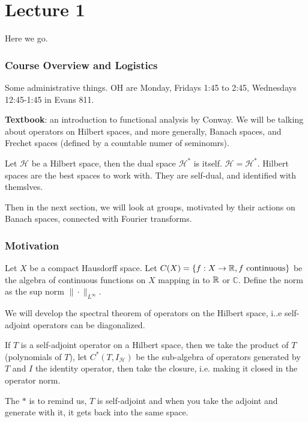 \chapter{Lecture 1}
Here we go.

\subsection{Course Overview and Logistics}
Some administrative things.
OH are Monday, Fridays 1:45 to 2:45, Wednesdays 12:45-1:45 in Evans 811.

\textbf{Textbook}: an introduction to functional analysis by Conway.
We will be talking about operators on Hilbert spaces, and more generally, Banach spaces, and Frechet spaces (defined by a countable numer of seminomrs).

\begin{remark}
    Let $\mathcal{H}$ be a Hilbert space, then the dual space $\mathcal{H}^*$ is itself. $\mathcal{H}=\mathcal{H}^*$.    
    Hilbert spaces are the best spaces to work with. They are self-dual, and identified with themslves.
\end{remark}
Then in the next section, we will look at groups, motivated by their actions on Banach spaces, connected with Fourier transforms. 


\subsection{Motivation}
Let $X$ be a compact Hausdorff space. Let $C(X)=\{f:X\to\mathbb{R}, f \text{ continuous}\} $ be the algebra of continuous functions on $X$ mapping in to $\mathbb{R}$ or $\mathbb{C}$.
Define the norm as the sup norm $\|\cdot\|_{L^\infty}$.

We will develop the spectral theorem of operators on the Hilbert space, i..e self-adjoint operators can be diagonalized.

If $T$ is a self-adjoint operator on a Hilbert space, then we take the product of $T$ (polynomials of $T$), let $C^*(T, I_\mathcal{H})$ be the sub-algebra of operators generated by $T$ and $I$ the identity operator, then take the closure, i.e. making it closed in the operator norm.

\begin{remark}
    The $*$ is to remind us, $T$ is self-adjoint and when you take the adjoint and generate with it, it gets back into the same space.
\end{remark}

